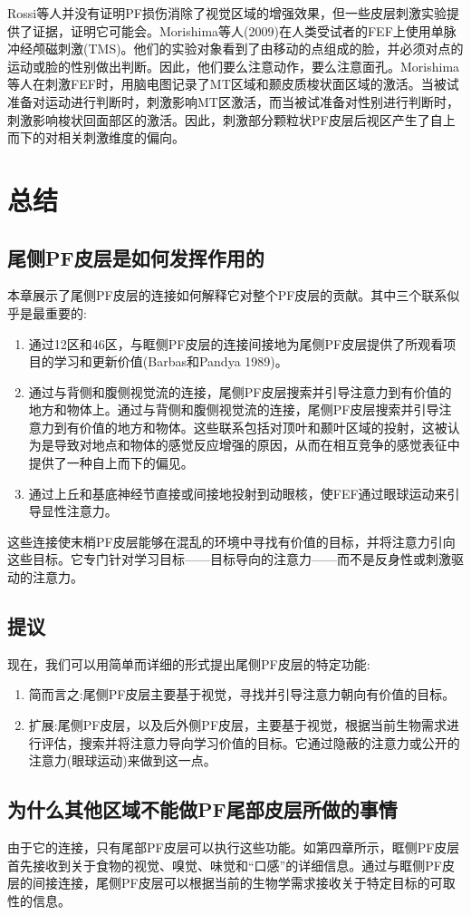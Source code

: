 Rossi等人并没有证明PF损伤消除了视觉区域的增强效果，但一些皮层刺激实验提供了证据，证明它可能会。Morishima等人(2009)在人类受试者的FEF上使用单脉冲经颅磁刺激(TMS)。他们的实验对象看到了由移动的点组成的脸，并必须对点的运动或脸的性别做出判断。因此，他们要么注意动作，要么注意面孔。Morishima等人在刺激FEF时，用脑电图记录了MT区域和颞皮质梭状面区域的激活。当被试准备对运动进行判断时，刺激影响MT区激活，而当被试准备对性别进行判断时，刺激影响梭状回面部区的激活。因此，刺激部分颗粒状PF皮层后视区产生了自上而下的对相关刺激维度的偏向。
\section{总结}
\subsection{尾侧PF皮层是如何发挥作用的}
本章展示了尾侧PF皮层的连接如何解释它对整个PF皮层的贡献。其中三个联系似乎是最重要的:
\begin{enumerate}
	\item 通过12区和46区，与眶侧PF皮层的连接间接地为尾侧PF皮层提供了所观看项目的学习和更新价值(Barbas和Pandya 1989)。
	\item 通过与背侧和腹侧视觉流的连接，尾侧PF皮层搜索并引导注意力到有价值的地方和物体上。通过与背侧和腹侧视觉流的连接，尾侧PF皮层搜索并引导注意力到有价值的地方和物体。这些联系包括对顶叶和颞叶区域的投射，这被认为是导致对地点和物体的感觉反应增强的原因，从而在相互竞争的感觉表征中提供了一种自上而下的偏见。
	\item 通过上丘和基底神经节直接或间接地投射到动眼核，使FEF通过眼球运动来引导显性注意力。
\end{enumerate}
这些连接使末梢PF皮层能够在混乱的环境中寻找有价值的目标，并将注意力引向这些目标。它专门针对学习目标——目标导向的注意力——而不是反身性或刺激驱动的注意力。
\subsection{提议}
现在，我们可以用简单而详细的形式提出尾侧PF皮层的特定功能:
\begin{enumerate}
	\item 简而言之:尾侧PF皮层主要基于视觉，寻找并引导注意力朝向有价值的目标。
	\item 扩展:尾侧PF皮层，以及后外侧PF皮层，主要基于视觉，根据当前生物需求进行评估，搜索并将注意力导向学习价值的目标。它通过隐蔽的注意力或公开的注意力(眼球运动)来做到这一点。
\end{enumerate}
\subsection{为什么其他区域不能做PF尾部皮层所做的事情}
由于它的连接，只有尾部PF皮层可以执行这些功能。如第四章所示，眶侧PF皮层首先接收到关于食物的视觉、嗅觉、味觉和“口感”的详细信息。通过与眶侧PF皮层的间接连接，尾侧PF皮层可以根据当前的生物学需求接收关于特定目标的可取性的信息。

